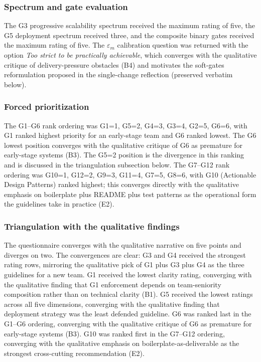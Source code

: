 \subsubsection*{Spectrum and gate evaluation}

The G3 progressive scalability spectrum received the maximum rating of five, the G5 deployment spectrum received three, and the composite binary gates received the maximum rating of five. The $\varepsilon_m$ calibration question was returned with the option \emph{Too strict to be practically achievable}, which converges with the qualitative critique of delivery-pressure obstacles (B4) and motivates the soft-gates reformulation proposed in the single-change reflection (preserved verbatim below).

\subsubsection*{Forced prioritization}

The G1--G6 rank ordering was G1=1, G5=2, G4=3, G3=4, G2=5, G6=6, with G1 ranked highest priority for an early-stage team and G6 ranked lowest. The G6 lowest position converges with the qualitative critique of G6 as premature for early-stage systems (B3). The G5=2 position is the divergence in this ranking and is discussed in the triangulation subsection below. The G7--G12 rank ordering was G10=1, G12=2, G9=3, G11=4, G7=5, G8=6, with G10 (Actionable Design Patterns) ranked highest; this converges directly with the qualitative emphasis on boilerplate plus README plus test patterns as the operational form the guidelines take in practice (E2).

\subsubsection*{Triangulation with the qualitative findings}

The questionnaire converges with the qualitative narrative on five points and diverges on two. The convergences are clear: G3 and G4 received the strongest rating rows, mirroring the qualitative pick of G1 plus G3 plus G4 as the three guidelines for a new team. G1 received the lowest clarity rating, converging with the qualitative finding that G1 enforcement depends on team-seniority composition rather than on technical clarity (B1). G5 received the lowest ratings across all five dimensions, converging with the qualitative finding that deployment strategy was the least defended guideline. G6 was ranked last in the G1--G6 ordering, converging with the qualitative critique of G6 as premature for early-stage systems (B3). G10 was ranked first in the G7--G12 ordering, converging with the qualitative emphasis on boilerplate-as-deliverable as the strongest cross-cutting recommendation (E2).

